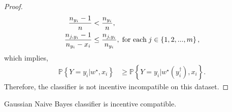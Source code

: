 \documentclass{article}
\begin{document}
\begin{proof}
\begin{align*}
\dfrac{n_{y_{i}} - 1}{n} &< \dfrac{n_{y_{i}}}{n} ,
\\ \dfrac{n_{j, y_{i}} - 1}{n_{y_{i}} - x_{i}} &\leq  \dfrac{n_{j, y_{i}}}{n_{y_{i}}}, \text{\;for each\;} j  \in \left\{1, 2, ..., m \right\} ,
\end{align*}
which implies,
\begin{align*}
\mathbb{P} \left\{Y = y_{i} | w^\star , x_{i}\right\} &\geq  \mathbb{P} \left\{Y = y_{i} | w^\star \left(y^{\dagger}_{i}\right), x_{i}\right\}.
\end{align*}
Therefore, the classifier is not incentive incompatible on this dataset.
\newline \newline\end{proof}
\begin{conj} \label{conj:gnb} 
Gaussian Naive Bayes classifier is incentive compatible.
\end{conj}
\end{document}
